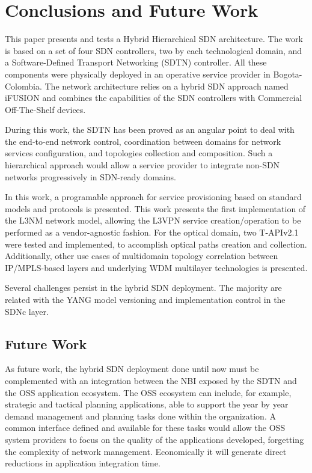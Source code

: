 \documentclass[a4paper,fleqn]{cas-dc}
\begin{document}
\section{Conclusions and Future Work}
\label{section:conclusions}

This paper presents and tests a Hybrid Hierarchical SDN architecture. The work is based on a set of four SDN controllers, two by each technological domain, and a Software-Defined Transport Networking (SDTN) controller. All these components were physically deployed in an operative service provider in Bogota-Colombia. The network architecture relies on a hybrid SDN approach named iFUSION and combines the capabilities of the SDN controllers with Commercial Off-The-Shelf devices.

During this work, the SDTN has been proved as an angular point to deal with the end-to-end network control, coordination between domains for network services configuration, and topologies collection and composition. Such a hierarchical approach would allow a service provider to integrate non-SDN networks progressively in SDN-ready domains.

In this work, a programable approach for service provisioning based on standard models and protocols is presented. This work presents the first implementation of the L3NM network model, allowing the L3VPN service creation/operation to be performed as a vendor-agnostic fashion. For the optical domain, two T-APIv2.1 were tested and implemented, to accomplish optical paths creation and collection. Additionally, other use cases of multidomain topology correlation between IP/MPLS-based layers and underlying WDM multilayer technologies is presented. 

Several challenges persist in the hybrid SDN deployment. The majority are related with the YANG model versioning and implementation control in the SDNc layer. 

\subsection{Future Work}
As future work, the hybrid SDN deployment done until now must be complemented with an integration between the NBI exposed by the SDTN and the OSS application ecosystem. The OSS ecosystem can include, for example, strategic and tactical planning applications, able to support the year by year demand management and planning tasks done within the organization. A common interface defined and available for these tasks would allow the OSS system providers to focus on the quality of the applications developed, forgetting the complexity of network management. Economically it will generate direct reductions in application integration time.
\end{document}
